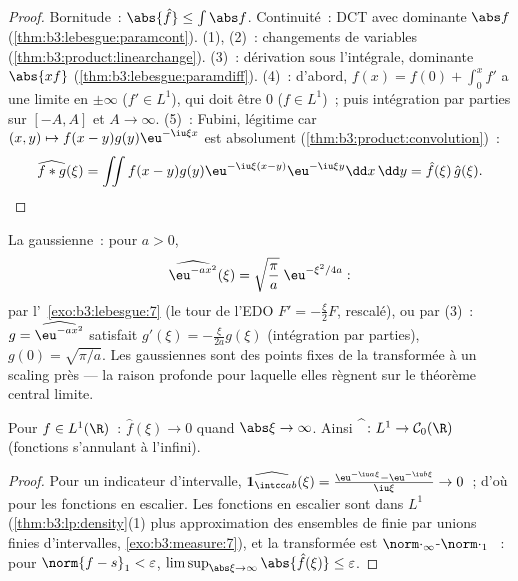 \begin{proof}
Bornitude~: $\abs{\hat f} \leq \int\abs f$. Continuité~: DCT
avec dominante $\abs f$ (\cref{thm:b3:lebesgue:paramcont}).
(1), (2)~: changements de variables
(\cref{thm:b3:product:linearchange}). (3)~: dérivation sous
l'intégrale, dominante $\abs{xf}$
(\cref{thm:b3:lebesgue:paramdiff}). (4)~: d'abord, $f(x) =
f(0) + \int_0^xf'$ a une limite en $\pm\infty$ ($f' \in L^1$),
qui doit être $0$ ($f \in L^1$)~; puis intégration par parties
sur $[-A, A]$ et $A \to \infty$. (5)~: Fubini, légitime car
$(x,y)\mapsto f(x - y)g(y)\eu^{-\iu\xi x}$ est absolument
 (\cref{thm:b3:product:convolution})~:
\[
\widehat{f*g}(\xi) = \iint f(x - y)g(y)\eu^{-\iu\xi(x - y)}
\eu^{-\iu\xi y}\dd x\,\dd y = \hat f(\xi)\,\hat g(\xi).
\]
\end{proof}

\begin{example}\label{ex:b3:fouriertransform:gaussian}
La gaussienne~: pour $a > 0$,
\[
\widehat{\eu^{-ax^2}}(\xi) =
\sqrt{\frac\pi a}\;\eu^{-\xi^2/4a} :
\]
par l'~\cref{exo:b3:lebesgue:7} (le tour de l'EDO $F' =
-\frac\xi{2}F$, rescalé), ou par (3)~: $g =
\widehat{\eu^{-ax^2}}$ satisfait $g'(\xi) =
-\frac{\xi}{2a}g(\xi)$ (intégration par parties), $g(0) =
\sqrt{\pi/a}$. Les gaussiennes sont des points fixes de la
transformée à un scaling près --- la raison profonde pour
laquelle elles règnent sur le théorème central limite.
\end{example}

\begin{theorem}
\label{thm:b3:fouriertransform:riemannlebesgue}
Pour $f \in L^1(\R)$~: $\hat f(\xi) \to 0$ quand $\abs\xi \to
\infty$. Ainsi $\widehat{\phantom f} \colon L^1 \to \mathcal
C_0(\R)$ (fonctions  s'annulant à
l'infini).
\end{theorem}

\begin{proof}
Pour un indicateur d'intervalle, $\widehat{\mathbf 1_{\intcc
ab}}(\xi) = \frac{\eu^{-\iu a\xi} - \eu^{-\iu b\xi}}{\iu\xi}
\to 0$~; d'où pour les fonctions en escalier. Les fonctions en
escalier sont  dans $L^1$
(\cref{thm:b3:lp:density}(1) plus approximation des ensembles
de  finie par unions finies d'intervalles,
\cref{exo:b3:measure:7}), et la transformée est
$\norm\cdot_\infty$-$\norm\cdot_1$ ~: pour $\norm{f -
s}_1 < \varepsilon$, $\limsup_{\abs\xi\to\infty}\abs{\hat
f(\xi)} \leq \varepsilon$.
\end{proof}


